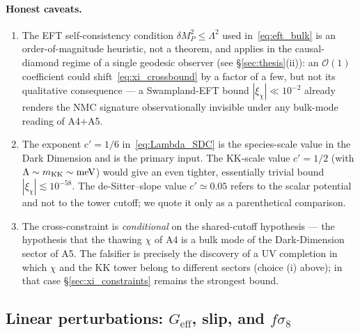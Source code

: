 \documentclass[epjc3,twocolumn]{svjour3}
\begin{document}
\paragraph{Honest caveats.}
\begin{enumerate}
\item The EFT self-consistency condition $\delta M_P^{2}\le\Lambda^{2}$
  used in~\eqref{eq:eft_bulk} is an order-of-magnitude heuristic, not a
  theorem, and applies in the causal-diamond regime of a single geodesic
  observer (see \S\ref{sec:thesis}(ii)): an $\mathcal{O}(1)$ coefficient could shift~\eqref{eq:xi_crossbound}
  by a factor of a few, but not its qualitative consequence --- a
  Swampland-EFT bound $|\xi_\chi|\ll 10^{-2}$ already renders the NMC
  signature observationally invisible under any bulk-mode reading of A4+A5.
\item The exponent $c'=1/6$ in~\eqref{eq:Lambda_SDC} is the species-scale
  value in the Dark Dimension and is the primary input. The KK-scale value
  $c'=1/2$ (with $\Lambda\sim m_{\rm KK}\sim\mathrm{meV}$) would give an
  even tighter, essentially trivial bound $|\xi_\chi|\lesssim 10^{-58}$.
  The de-Sitter--slope value $c'\simeq 0.05$ refers to the scalar potential
  and not to the tower cutoff; we quote it only as a parenthetical
  comparison.
\item The cross-constraint is \emph{conditional} on the shared-cutoff
  hypothesis --- the hypothesis that the thawing $\chi$ of A4 is a bulk
  mode of the Dark-Dimension sector of A5. The falsifier is precisely the
  discovery of a UV completion in which $\chi$ and the KK tower belong to
  different sectors (choice (i) above); in that case
  \S\ref{sec:xi_constraints} remains the strongest bound.
\end{enumerate}


\subsection{Linear perturbations: $G_{\mathrm{eff}}$, slip, and $f\sigma_8$}
\label{subsec:perturb}
\end{document}
